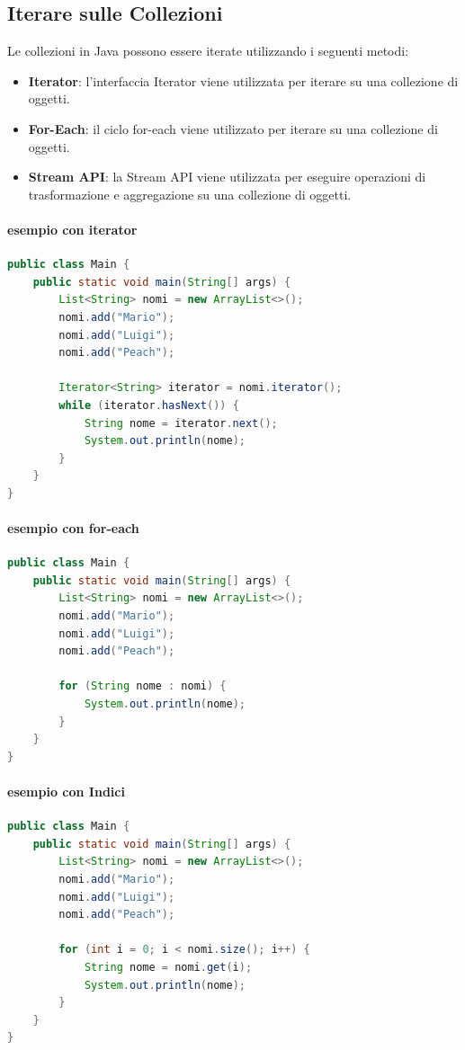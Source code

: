 \documentclass[11pt]{article}
\begin{document}
\subsection{Iterare sulle Collezioni}
Le collezioni in Java possono essere iterate utilizzando i seguenti metodi:
\begin{itemize}
    \item \textbf{Iterator}: l'interfaccia Iterator viene utilizzata per iterare su una collezione di oggetti.
    \item \textbf{For-Each}: il ciclo for-each viene utilizzato per iterare su una collezione di oggetti.
    \item \textbf{Stream API}: la Stream API viene utilizzata per eseguire operazioni di trasformazione e aggregazione su una collezione di oggetti.
    \end{itemize}
\paragraph{esempio con iterator}
\begin{lstlisting}[language=Java]
public class Main {
    public static void main(String[] args) {
        List<String> nomi = new ArrayList<>();
        nomi.add("Mario");
        nomi.add("Luigi");
        nomi.add("Peach");

        Iterator<String> iterator = nomi.iterator();
        while (iterator.hasNext()) {
            String nome = iterator.next();
            System.out.println(nome);
        }
    }
}
\end{lstlisting}
\paragraph{esempio con for-each}
\begin{lstlisting}[language=Java]
public class Main {
    public static void main(String[] args) {
        List<String> nomi = new ArrayList<>();
        nomi.add("Mario");
        nomi.add("Luigi");
        nomi.add("Peach");

        for (String nome : nomi) {
            System.out.println(nome);
        }
    }
}
\end{lstlisting}
\paragraph{esempio con Indici}
\begin{lstlisting}[language=Java]
public class Main {
    public static void main(String[] args) {
        List<String> nomi = new ArrayList<>();
        nomi.add("Mario");
        nomi.add("Luigi");
        nomi.add("Peach");

        for (int i = 0; i < nomi.size(); i++) {
            String nome = nomi.get(i);
            System.out.println(nome);
        }
    }
}
\end{lstlisting}
\end{document}
